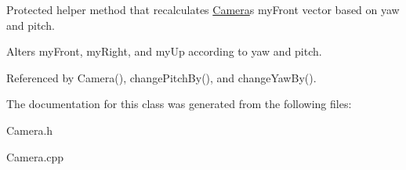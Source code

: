 Protected helper method that recalculates \hyperlink{classtsgl_1_1_camera}{Camera}\textquotesingle{}s my\+Front vector based on yaw and pitch. 

Alters my\+Front, my\+Right, and my\+Up according to yaw and pitch. 

Referenced by Camera(), change\+Pitch\+By(), and change\+Yaw\+By().



The documentation for this class was generated from the following files\+:\begin{DoxyCompactItemize}
\item 
Camera.\+h\item 
Camera.\+cpp\end{DoxyCompactItemize}

